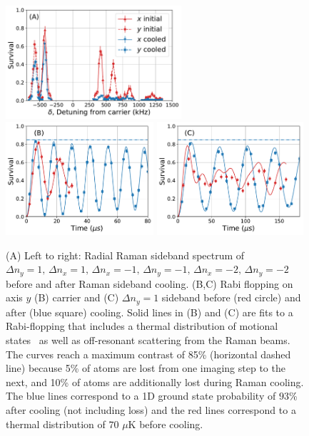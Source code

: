 \documentclass[aps,prl,twocolumn,groupedaddress]{revtex4-1}
\begin{document}
\begin{figure}
  \includegraphics[height=4.2cm]{imgs/spectrum_r.pdf}
  \includegraphics[height=4.2cm]{imgs/rabi_flop_r3_0.pdf}
  \includegraphics[height=4.2cm]{imgs/rabi_flop_r3_p1.pdf}
  \caption{(A) Left to right: Radial Raman sideband spectrum of $\Delta n_y=1,\,\Delta n_x=1,\,\Delta n_x=-1,\,\Delta n_y=-1,\,\Delta n_x=-2,\,\Delta n_y=-2$  before and after Raman sideband cooling.
    (B,C) Rabi flopping on axis $y$ (B) carrier and (C) $\Delta n_y=1$  sideband
    before (red circle) and after (blue square) cooling.
    Solid lines in (B) and (C) are 
    fits to a Rabi-flopping that includes a thermal distribution of motional states~\cite{Meekhof1996}  as well as off-resonant scattering from the Raman beams.  The curves reach a maximum contrast of 85\% (horizontal dashed line) because 5\% of atoms are lost from one imaging step to the next, and 10\% of atoms are additionally lost during Raman cooling.
    The blue lines correspond to a 1D ground state probability of $93$\% after cooling (not including loss) and
    the red lines correspond to a thermal distribution of $70$ $\mu$K before cooling.
    \label{f-radial}}
\end{figure}
\end{document}
